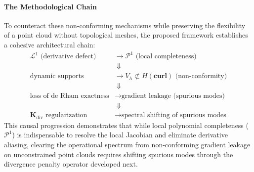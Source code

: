 \documentclass[preprint,12pt]{elsarticle}
\begin{document}
\paragraph{The Methodological Chain}
To counteract these non-conforming mechanisms while preserving the flexibility of a point cloud without topological meshes, the proposed framework establishes a cohesive architectural chain:
\begin{equation}
    \boxed{
        \begin{aligned}
            \mathcal{L}^1 \text{ (derivative defect)}        & \longrightarrow \mathcal{P}^1 \text{ (local completeness)}                \\
                                                             & \;\Downarrow                                                              \\
            \text{dynamic supports}                          & \longrightarrow V_h \not\subset H(\mathbf{curl}) \text{ (non-conformity)} \\
                                                             & \;\Downarrow                                                              \\
            \text{loss of de Rham exactness}                 & \longrightarrow \text{gradient leakage (spurious modes)}                  \\
                                                             & \;\Downarrow                                                              \\
            \mathbf{K}_{\mathrm{div}} \text{ regularization} & \longrightarrow \text{spectral shifting of spurious modes}
        \end{aligned}
    }
    \label{eq:conceptual_chain}
\end{equation}
This causal progression demonstrates that while local polynomial completeness ($\mathcal{P}^1$) is indispensable to resolve the local Jacobian and eliminate derivative aliasing, clearing the operational spectrum from non-conforming gradient leakage on unconstrained point clouds requires shifting spurious modes through the divergence penalty operator developed next.
\end{document}
